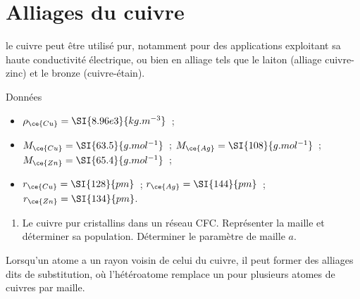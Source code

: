 \documentclass[a4paper, 10pt, final, garamond]{book}
\begin{document}
\section{Alliages du cuivre}
le cuivre peut être utilisé pur, notamment pour des applications exploitant sa
haute conductivité électrique, ou bien en alliage tels que le laiton (alliage
cuivre-zinc) et le bronze (cuivre-étain).
\begin{rdefi}{Données}
  \begin{itemize}[label=$\diamond$]
    \item $\rho_{\ce{Cu}} = \SI{8.96e3}{kg.m ^{-3}}$~;
    \item $M_{\ce{Cu}} = \SI{63.5}{g.mol^{-1}}$~; $M_{\ce{Ag}} =
      \SI{108}{g.mol^{-1}}$~; $M_{\ce{Zn}} = \SI{65.4}{g.mol^{-1}}$~;
    \item $r_{\ce{Cu}} = \SI{128}{pm}$~; $r_{\ce{Ag}} = \SI{144}{pm}$~;
      $r_{\ce{Zn}} = \SI{134}{pm}$.
  \end{itemize}
\end{rdefi}
\begin{enumerate}
  \item Le cuivre pur cristallins dans un réseau CFC. Représenter la maille et
    déterminer sa population. Déterminer le paramètre de maille $a$.
\end{enumerate}
Lorsqu'un atome a un rayon voisin de celui du cuivre, il peut former des
alliages dits de substitution, où l'hétéroatome remplace un pour plusieurs
atomes de cuivres par maille.
\end{document}
